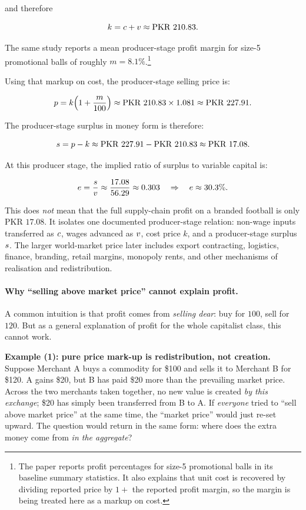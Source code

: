 \begin{example}
and therefore

\[
k=c+v
\approx
\text{PKR }210.83.
\]

The same study reports a mean producer-stage profit margin for size-5 promotional
balls of roughly \(m=8.1\%\).\footnote{The paper reports profit percentages
for size-5 promotional balls in its baseline summary statistics. It also explains
that unit cost is recovered by dividing reported price by \(1+\) the reported
profit margin, so the margin is being treated here as a markup on cost.}

Using that markup on cost, the producer-stage selling price is:

\[
p
=
k\Bigl(1+\frac{m}{100}\Bigr)
\approx
\text{PKR }210.83 \times 1.081
\approx
\text{PKR }227.91.
\]

The producer-stage surplus in money form is therefore:

\[
s
=
p-k
\approx
\text{PKR }227.91
-
\text{PKR }210.83
\approx
\text{PKR }17.08.
\]

At this producer stage, the implied ratio of surplus to variable capital is:

\[
e
=
\frac{s}{v}
\approx
\frac{17.08}{56.29}
\approx
0.303
\quad\Rightarrow\quad
e\approx 30.3\%.
\]

This does \emph{not} mean that the full supply-chain profit on a branded football
is only \(\text{PKR }17.08\). It isolates one documented producer-stage relation:
non-wage inputs transferred as \(c\), wages advanced as \(v\),
cost price \(k\), and a producer-stage surplus \(s\). The larger
world-market price later includes export contracting, logistics, finance,
branding, retail margins, monopoly rents, and other mechanisms of realisation
and redistribution.

\end{example}

\paragraph{Why ``selling above market price'' cannot explain profit.}
A common intuition is that profit comes from \emph{selling dear}: buy for $100$, sell for $120$.
But as a general explanation of profit for the whole capitalist class, this cannot work.

\textbf{Example (1): pure price mark-up is redistribution, not creation.}
Suppose Merchant A buys a commodity for \$100 and sells it to Merchant B for \$120.
A gains \$20, but B has paid \$20 more than the prevailing market price. Across the two
merchants taken together, no new value is created \emph{by this exchange}; \$20 has simply been
transferred from B to A. If \emph{everyone} tried to ``sell above market price'' at the same time,
the ``market price'' would just re-set upward. The question would return in the same form:
where does the extra money come from \emph{in the aggregate}?


